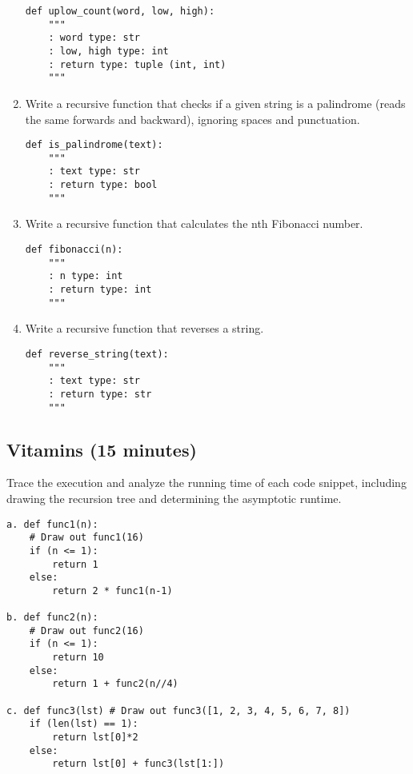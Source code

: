 \documentclass{article}
\begin{document}
\begin{enumerate}
\begin{verbatim}
def uplow_count(word, low, high):
    """
    : word type: str
    : low, high type: int
    : return type: tuple (int, int)
    """
    \end{verbatim}
    \item Write a recursive function that checks if a given string is a palindrome (reads the same forwards and backward), ignoring spaces and punctuation.
    \begin{verbatim}
def is_palindrome(text):
    """
    : text type: str
    : return type: bool
    """
    \end{verbatim}
    \item Write a recursive function that calculates the nth Fibonacci number.
    \begin{verbatim}
def fibonacci(n):
    """
    : n type: int
    : return type: int
    """
    \end{verbatim}
    \item Write a recursive function that reverses a string.
    \begin{verbatim}
def reverse_string(text):
    """
    : text type: str
    : return type: str
    """
    \end{verbatim}
\end{enumerate}

\subsection*{Vitamins (15 minutes)}

Trace the execution and analyze the running time of each code snippet, including drawing the recursion tree and determining the asymptotic runtime.

\begin{verbatim}
a. def func1(n):
    # Draw out func1(16)
    if (n <= 1):
        return 1
    else:
        return 2 * func1(n-1)

b. def func2(n):
    # Draw out func2(16)
    if (n <= 1):
        return 10
    else:
        return 1 + func2(n//4)

c. def func3(lst) # Draw out func3([1, 2, 3, 4, 5, 6, 7, 8])
    if (len(lst) == 1):
        return lst[0]*2
    else:
        return lst[0] + func3(lst[1:])
\end{verbatim}
\end{document}
